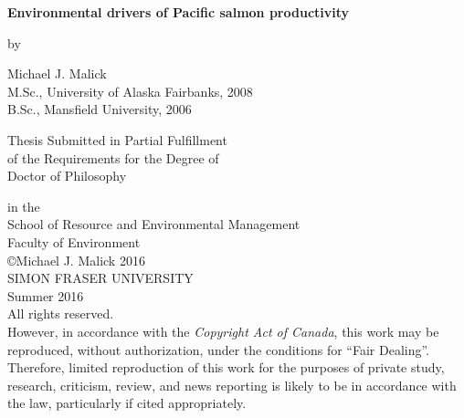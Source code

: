 


\vspace*{3mm}
\begin{center}

\begin{spacing}{2.0}
  { \Large \textbf{Environmental drivers of Pacific salmon productivity}}
\end{spacing}

\vspace{5mm}
by
\vspace{5mm}

\begin{doublespace}
Michael J. Malick  \\
M.Sc., University of Alaska Fairbanks, 2008 \\
B.Sc., Mansfield University, 2006 \\
\end{doublespace}

\vspace{10mm}
Thesis Submitted in Partial Fulfillment \\
of the Requirements for the Degree of \\

\vspace{5mm}
Doctor of Philosophy \\
\vspace{5mm}

in the \\
School of Resource and Environmental Management \\
Faculty of Environment \\

\vspace{10mm}
\copyright Michael J. Malick 2016 \\
SIMON FRASER UNIVERSITY \\
Summer 2016 \\

\vspace{15mm}
All rights reserved. \\
However, in accordance with the \emph{Copyright Act of Canada},
this work may be reproduced, without authorization, under the conditions for
``Fair Dealing''. Therefore, limited reproduction of this work for the purposes
of private study, research, criticism, review, and news reporting is likely to
be in accordance with the law, particularly if cited appropriately.


\end{center}



